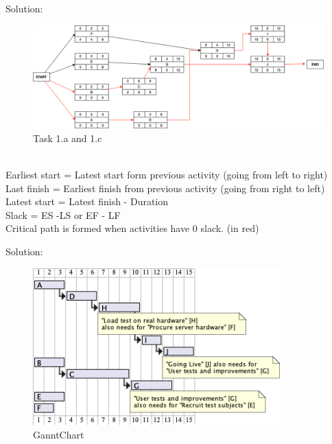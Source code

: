 \begin{parlist}
	\item Solution: 
	\begin{figure}[hbt]
	\centering
  \includegraphics[width=1.4\textwidth]{Immagini/ND.png}
	  \caption{Task 1.a and 1.c}
\end{figure}
\\
Earliest start = Latest start form previous activity (going from left to right)\\
Last finish = Earliest finish from previous activity (going from right to left)\\
Latest start = Latest finish - Duration\\
Slack = ES -LS or EF - LF\\
Critical path is formed when activities have 0 slack. (in red) \cite{CriticalPath}

	\item Solution:
\begin{figure}[hbt]
	\centering
  \includegraphics[width=0.85\textwidth]{Immagini/ganntChart.png}
  \caption{GanntChart}
\end{figure}
\end{parlist}